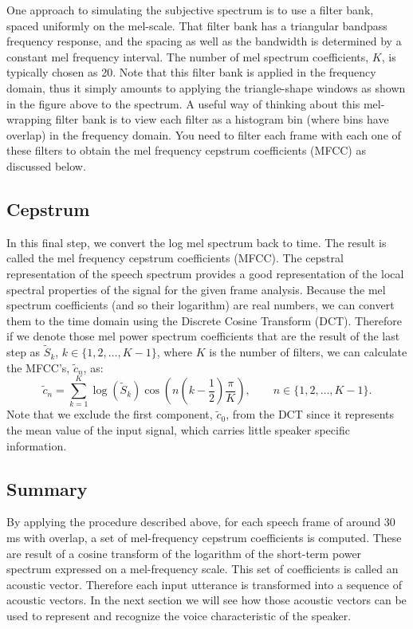 \documentclass{article}
\begin{document}
One approach to simulating the subjective spectrum is to use a filter bank, spaced uniformly on the mel-scale.  That filter bank has a triangular bandpass frequency response, and the spacing as well as the bandwidth is determined by a constant mel frequency interval.  The number of mel spectrum coefficients, $K$, is typically chosen as 20.  Note that this filter bank is applied in the frequency domain, thus it simply amounts to applying the triangle-shape windows as shown in the figure above to the spectrum.  A useful way of thinking about this mel-wrapping filter bank is to view each filter as a histogram bin (where bins have overlap) in the frequency domain. %
You need to filter each frame with each one of these filters to obtain the mel frequency cepstrum coefficients (MFCC) as discussed below.

\subsection{Cepstrum}
In this final step, we convert the log mel spectrum back to time.  The result is called the mel frequency cepstrum coefficients (MFCC).  The cepstral representation of the speech spectrum provides a good representation of the local spectral properties of the signal for the given frame analysis. Because the mel spectrum coefficients (and so their logarithm) are real numbers, we can convert them to the time domain using the Discrete Cosine Transform (DCT).  Therefore if we denote those mel power spectrum coefficients that are the result of the last step as $\tilde{S}_k$, $k\in\{1,2,\dots,K-1\}$, where $K$ is the number of filters, we can calculate the MFCC's, $\tilde{c}_n$, as: 
\begin{equation}
    \tilde{c}_n = \sum_{k=1}^K \log(\tilde{S}_k)\cos\left(n \left(k-\frac{1}{2}\right)\frac{\pi}{K}\right), \qquad n\in\{1,2,\dots,K-1\}.
\end{equation}
Note that we exclude the first component, $\tilde{c}_0$, from the DCT since it represents the mean value of the input signal, which carries little speaker specific information.

\subsection{Summary}
By applying the procedure described above, for each speech frame of around 30 ms with overlap, a set of mel-frequency cepstrum coefficients is computed.  These are result of a cosine transform of the logarithm of the short-term power spectrum expressed on a mel-frequency scale.  This set of coefficients is called an acoustic vector.  Therefore each input utterance is transformed into a sequence of acoustic vectors. In the next section we will see how those acoustic vectors can be used to represent and recognize the voice characteristic of the speaker.
\end{document}

